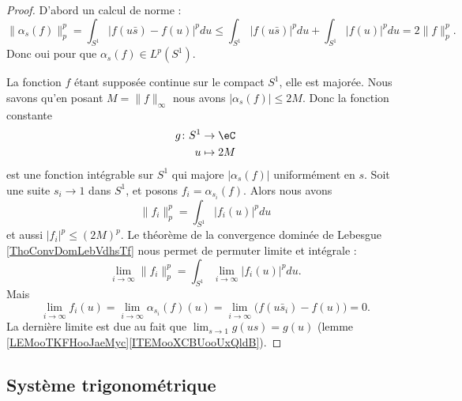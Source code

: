 \begin{proof}
	D'abord un calcul de norme :
	\begin{equation}
		\| \alpha_s(f) \|_p^p=\int_{S^1}| f(u\bar s)-f(u) |^pdu\leq\int_{S^1}| f(u\bar s) |^pdu+\int_{S^1}| f(u) |^pdu=2\| f \|_p^p.
	\end{equation}
	Donc oui pour que \( \alpha_s(f)\in L^p(S^1)\).

	La fonction \( f\) étant supposée continue sur le compact \( S^1\), elle est majorée. Nous savons qu'en posant \( M=\| f \|_{\infty}\) nous avons \( | \alpha_s(f) |\leq 2M\). Donc la fonction constante
	\begin{equation}
		\begin{aligned}
			g\colon S^1 & \to \eC    \\
			u           & \mapsto 2M
		\end{aligned}
	\end{equation}
	est une fonction intégrable sur \( S^1\) qui majore \( | \alpha_s(f) |\) uniformément en \( s\). Soit une suite \( s_i\to 1\) dans \( S^1\), et posons \( f_i=\alpha_{s_i}(f)\). Alors nous avons
	\begin{equation}
		\| f_i \|^p_p=\int_{S^1}| f_i(u) |^pdu
	\end{equation}
	et aussi \( | f_i |^p\leq (2M)^p\). Le théorème de la convergence dominée de Lebesgue \ref{ThoConvDomLebVdhsTf} nous permet de permuter limite et intégrale :
	\begin{equation}
		\lim_{i\to \infty} \| f_i \|_p^p=\int_{S^1}\lim_{i\to \infty} | f_i(u) |^pdu.
	\end{equation}
	Mais
	\begin{equation}
		\lim_{i\to \infty} f_i(u)=\lim_{i\to \infty} \alpha_{s_i}(f)(u)=\lim_{i\to \infty} \big( f(u\bar s_i)-f(u) \big)=0.
	\end{equation}
	La dernière limite est due au fait que \(  \lim_{s\to 1} g(us)=g(u) \) (lemme \ref{LEMooTKFHooJaeMyc}\ref{ITEMooXCBUooUxQldB}).
\end{proof}

\subsection{Système trigonométrique}

